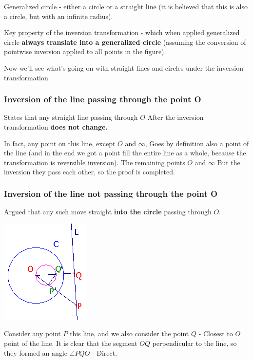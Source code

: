 Generalized circle - either a circle or a straight line (it is believed that this is also a circle, but with an infinite radius).

Key property of the inversion transformation - which when applied generalized circle \textbf{always translate into a generalized circle} (assuming the conversion of pointwise inversion applied to all points in the figure).

Now we'll see what's going on with straight lines and circles under the inversion transformation.

\subsubsection{ Inversion of the line passing through the point O}

States that any straight line passing through $O$ After the inversion transformation \textbf{does not change.}

In fact, any point on this line, except $O$ and $\infty$, Goes by definition also a point of the line (and in the end we got a point fill the entire line as a whole, because the transformation is reversible inversion). The remaining points $O$ and $\infty$ But the inversion they pass each other, so the proof is completed.

\subsubsection{ Inversion of the line not passing through the point O}

Argued that any such move straight \textbf{into the circle} passing through $O$.

\includegraphics[scale=0.5]{8.png}

Consider any point $P$ this line, and we also consider the point $Q$ - Closest to $O$ point of the line. It is clear that the segment $OQ$ perpendicular to the line, so they formed an angle $\angle PQO$ - Direct.

